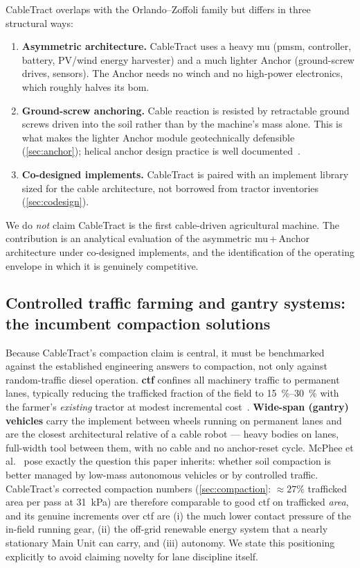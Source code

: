 \documentclass[11pt,a4paper]{article}
\begin{document}
CableTract overlaps with the Orlando--Zoffoli family but differs in three structural ways:

\begin{enumerate}[leftmargin=1.6em,itemsep=0.2em]
    \item \textbf{Asymmetric architecture.} CableTract uses a heavy \gls{mu} (\gls{pmsm}, controller, battery, PV/wind energy harvester) and a much lighter Anchor (ground-screw drives, sensors). The Anchor needs no winch and no high-power electronics, which roughly halves its \gls{bom}.
    \item \textbf{Ground-screw anchoring.} Cable reaction is resisted by retractable ground screws driven into the soil rather than by the machine's mass alone. This is what makes the lighter Anchor module geotechnically defensible (\cref{sec:anchor}); helical anchor design practice is well documented~\cite{perko2009helical,ac358}.
    \item \textbf{Co-designed implements.} CableTract is paired with an implement library sized for the cable architecture, not borrowed from tractor inventories (\cref{sec:codesign}).
\end{enumerate}

We do \emph{not} claim CableTract is the first cable-driven agricultural machine. The contribution is an analytical evaluation of the asymmetric \gls{mu}\,+\,Anchor architecture under co-designed implements, and the identification of the operating envelope in which it is genuinely competitive.

\subsection{Controlled traffic farming and gantry systems: the incumbent compaction solutions}\label{sec:related-ctf}

Because CableTract's compaction claim is central, it must be benchmarked against the established engineering answers to compaction, not only against random-traffic diesel operation. \textbf{\Gls{ctf}} confines all machinery traffic to permanent lanes, typically reducing the trafficked fraction of the field to \SIrange{15}{30}{\percent} with the farmer's \emph{existing} tractor at modest incremental cost~\cite{tullberg2007ctf,chamen2015mitigating}. \textbf{Wide-span (gantry) vehicles} carry the implement between wheels running on permanent lanes and are the closest architectural relative of a cable robot --- heavy bodies on lanes, full-width tool between them, with no cable and no anchor-reset cycle. McPhee et al.~\cite{mcphee2020lowmass} pose exactly the question this paper inherits: whether soil compaction is better managed by low-mass autonomous vehicles or by controlled traffic. CableTract's corrected compaction numbers (\cref{sec:compaction}: ${\approx}27\%$ trafficked area per pass at \SI{31}{\kilo\pascal}) are therefore comparable to good \gls{ctf} on trafficked \emph{area}, and its genuine increments over \gls{ctf} are (i) the much lower contact pressure of the in-field running gear, (ii) the off-grid renewable energy system that a nearly stationary Main Unit can carry, and (iii) autonomy. We state this positioning explicitly to avoid claiming novelty for lane discipline itself.
\end{document}
